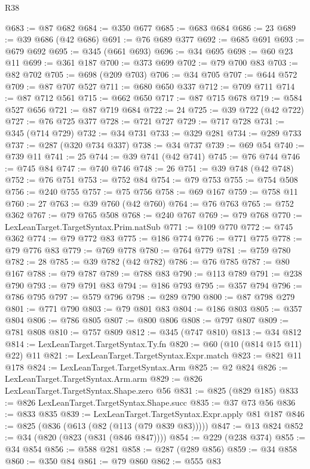 \begin{lexlean}{R38}
\begin{coremodule}
@683 := @87 @682
@684 := @350 @677
@685 := @683 @684
@686 := 23
@689 := @39 @686 (@42 @686)
@691 := @76 @689 @377
@692 := @685 @691
@693 := @679 @692
@695 := @345 (@661 @693)
@696 := @34 @695
@698 := @60 @23 @11
@699 := @361 @187
@700 := @373 @699
@702 := @79 @700 @83
@703 := @82 @702
@705 := @698 (@209 @703)
@706 := @34 @705
@707 := @644 @572
@709 := @87 @707 @527
@711 := @680 @650 @337
@712 := @709 @711
@714 := @87 @712 @561
@715 := @662 @650
@717 := @87 @715 @678
@719 := @584 @527 @656
@721 := @87 @719 @684
@722 := 24
@725 := @39 @722 (@42 @722)
@727 := @76 @725 @377
@728 := @721 @727
@729 := @717 @728
@731 := @345 (@714 @729)
@732 := @34 @731
@733 := @329 @281
@734 := @289 @733
@737 := @287 (@320 @734 @337)
@738 := @34 @737
@739 := @69 @54
@740 := @739 @11
@741 := 25
@744 := @39 @741 (@42 @741)
@745 := @76 @744
@746 := @745 @84
@747 := @740 @746
@748 := 26
@751 := @39 @748 (@42 @748)
@752 := @76 @751
@753 := @752 @84
@754 := @79 @753
@755 := @754 @508
@756 := @240 @755
@757 := @75 @756
@758 := @69 @167
@759 := @758 @11
@760 := 27
@763 := @39 @760 (@42 @760)
@764 := @76 @763
@765 := @752 @362
@767 := @79 @765 @508
@768 := @240 @767
@769 := @79 @768
@770 := LexLeanTarget.TargetSyntax.Prim.natSub
@771 := @109 @770
@772 := @745 @362
@774 := @79 @772 @83
@775 := @186 @774
@776 := @771 @775
@778 := @79 @776 @83
@779 := @769 @778
@780 := @764 @779
@781 := @759 @780
@782 := 28
@785 := @39 @782 (@42 @782)
@786 := @76 @785
@787 := @80 @167
@788 := @79 @787
@789 := @788 @83
@790 := @113 @789
@791 := @238 @790
@793 := @79 @791 @83
@794 := @186 @793
@795 := @357 @794
@796 := @786 @795
@797 := @579 @796
@798 := @289 @790
@800 := @87 @798 @279
@801 := @771 @790
@803 := @79 @801 @83
@804 := @186 @803
@805 := @357 @804
@806 := @786 @805
@807 := @800 @806
@808 := @797 @807
@809 := @781 @808
@810 := @757 @809
@812 := @345 (@747 @810)
@813 := @34 @812
@814 := LexLeanTarget.TargetSyntax.Ty.fn
@820 := @60 (@10 (@814 @15 @11) @22) @11
@821 := LexLeanTarget.TargetSyntax.Expr.match
@823 := @821 @11 @178
@824 := LexLeanTarget.TargetSyntax.Arm
@825 := @2 @824
@826 := LexLeanTarget.TargetSyntax.Arm.arm
@829 := @826 LexLeanTarget.TargetSyntax.Shape.zero @56
@831 := @825 (@829 @185)
@833 := @826 LexLeanTarget.TargetSyntax.Shape.succ
@835 := @37 @73 @56
@836 := @833 @835
@839 := LexLeanTarget.TargetSyntax.Expr.apply @81 @187
@846 := @825 (@836 (@613 (@82 (@113 (@79 @839 @83)))))
@847 := @13 @824
@852 := @34 (@820 (@823 (@831 (@846 @847))))
@854 := @229 (@238 @374)
@855 := @34 @854
@856 := @588 @281
@858 := @287 (@289 @856)
@859 := @34 @858
@860 := @350 @84
@861 := @79 @860
@862 := @555 @83

\end{coremodule}
\end{lexlean}
